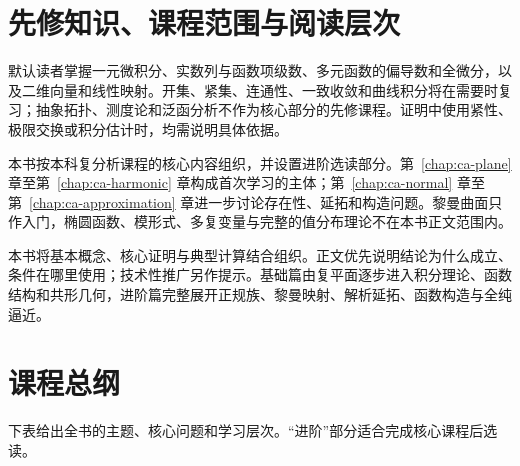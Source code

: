 \section{先修知识、课程范围与阅读层次}

默认读者掌握一元微积分、实数列与函数项级数、多元函数的偏导数和全微分，以及二维向量和线性映射。开集、紧集、连通性、一致收敛和曲线积分将在需要时复习；抽象拓扑、测度论和泛函分析不作为核心部分的先修课程。证明中使用紧性、极限交换或积分估计时，均需说明具体依据。

本书按本科复分析课程的核心内容组织，并设置进阶选读部分。第~\ref{chap:ca-plane} 章至第~\ref{chap:ca-harmonic} 章构成首次学习的主体；第~\ref{chap:ca-normal} 章至第~\ref{chap:ca-approximation} 章进一步讨论存在性、延拓和构造问题。黎曼曲面只作入门，椭圆函数、模形式、多复变量与完整的值分布理论不在本书正文范围内。

本书将基本概念、核心证明与典型计算结合组织。正文优先说明结论为什么成立、条件在哪里使用；技术性推广另作提示。基础篇由复平面逐步进入积分理论、函数结构和共形几何，进阶篇完整展开正规族、黎曼映射、解析延拓、函数构造与全纯逼近。

\section{课程总纲}

下表给出全书的主题、核心问题和学习层次。“进阶”部分适合完成核心课程后选读。

